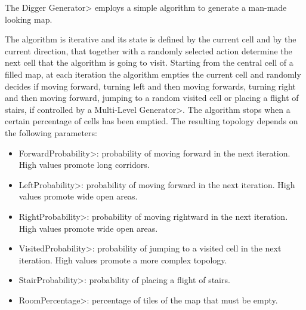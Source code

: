 The \<Digger Generator> employs a simple algorithm to generate a man-made looking map.

\par

The algorithm is iterative and its state is defined by the current cell and by the current direction, that together with a randomly selected action determine the next cell that the algorithm is going to visit. Starting from the central cell of a filled map, at each iteration the algorithm empties the current cell and randomly decides if moving forward, turning left and then moving forwards, turning right and then moving forward, jumping to a random visited cell or placing a flight of stairs, if controlled by a \<Multi-Level Generator>. The algorithm stops when a certain percentage of cells has been emptied. The resulting topology depends on the following parameters:

\begin{itemize}
\item \<ForwardProbability>: probability of moving forward in the next iteration. High values promote long corridors. 
\item \<LeftProbability>: probability of moving forward in the next iteration. High values promote wide open areas. 
\item \<RightProbability>: probability of moving rightward in the next iteration. High values promote wide open areas. 
\item \<VisitedProbability>: probability of jumping to a visited cell in the next iteration. High values promote a more complex topology. 
\item \<StairProbability>: probability of placing a flight of stairs.
\item \<RoomPercentage>: percentage of tiles of the map that must be empty.
\end{itemize}

